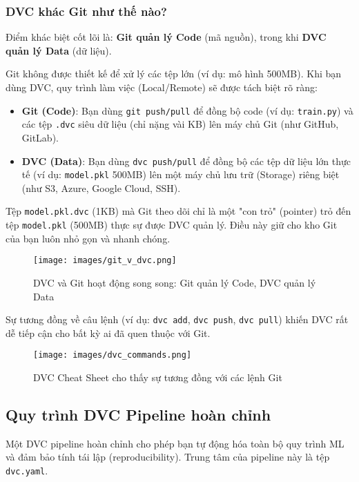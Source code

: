 \documentclass[11pt]{article}
\begin{document}
\subsubsection{DVC khác Git như thế nào?}
Điểm khác biệt cốt lõi là: \textbf{Git quản lý Code} (mã nguồn), trong khi \textbf{DVC quản lý Data} (dữ liệu).

Git không được thiết kế để xử lý các tệp lớn (ví dụ: mô hình 500MB). Khi bạn dùng DVC, quy trình làm việc (Local/Remote) sẽ được tách biệt rõ ràng:
\begin{itemize}
    \item \textbf{Git (Code)}: Bạn dùng \texttt{git push/pull} để đồng bộ code (ví dụ: \texttt{train.py}) và các tệp \texttt{.dvc} siêu dữ liệu (chỉ nặng vài KB) lên máy chủ Git (như GitHub, GitLab).
    \item \textbf{DVC (Data)}: Bạn dùng \texttt{dvc push/pull} để đồng bộ các tệp dữ liệu lớn thực tế (ví dụ: \texttt{model.pkl} 500MB) lên một máy chủ lưu trữ (Storage) riêng biệt (như S3, Azure, Google Cloud, SSH).
\end{itemize}

Tệp \texttt{model.pkl.dvc} (1KB) mà Git theo dõi chỉ là một "con trỏ" (pointer) trỏ đến tệp \texttt{model.pkl} (500MB) thực sự được DVC quản lý. Điều này giữ cho kho Git của bạn luôn nhỏ gọn và nhanh chóng.

\begin{figure}[H]
    \centering
    \texttt{[image: images/git\_v\_dvc.png]}
    \caption{DVC và Git hoạt động song song: Git quản lý Code, DVC quản lý Data}
\end{figure}

Sự tương đồng về câu lệnh (ví dụ: \texttt{dvc add}, \texttt{dvc push}, \texttt{dvc pull}) khiến DVC rất dễ tiếp cận cho bất kỳ ai đã quen thuộc với Git.

\begin{figure}[H]
    \centering
    \texttt{[image: images/dvc\_commands.png]}
    \caption{DVC Cheat Sheet cho thấy sự tương đồng với các lệnh Git}
\end{figure}

\subsection{Quy trình DVC Pipeline hoàn chỉnh}
Một DVC pipeline hoàn chỉnh cho phép bạn tự động hóa toàn bộ quy trình ML và đảm bảo tính tái lập (reproducibility). Trung tâm của pipeline này là tệp \texttt{dvc.yaml}.
\end{document}
